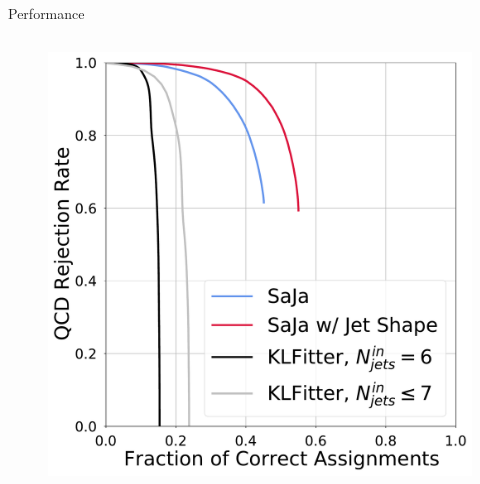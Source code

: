 \begin{frame}[fragile]{Performance}
\begin{columns}
\begin{figure}
        \includegraphics[height=0.32\textheight]{fig/roc/roc_qcd_rej_vs_correct.pdf}
      \end{figure}
  \end{columns}
\end{frame}

